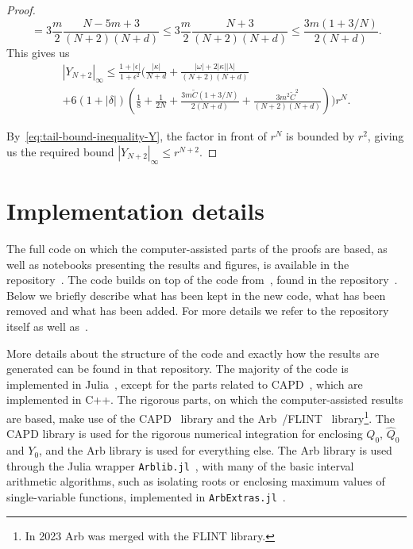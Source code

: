 \documentclass[11pt]{article}
\begin{document}
\begin{proof}
\begin{equation*}
    = 3\frac{m}{2}\frac{N - 5m + 3}{(N + 2)(N + d)}
    \leq 3\frac{m}{2}\frac{N + 3}{(N + 2)(N + d)}
    \leq \frac{3m(1 + 3/N)}{2(N + d)}.
  \end{equation*}
  This gives us
  \begin{multline*}
    |Y_{N + 2}|_{\infty} \leq
    \frac{1 + |\epsilon|}{1 + \epsilon^{2}}\Bigg(
    \frac{|\kappa|}{N + d}
    + \frac{|\omega| + 2|\kappa||\lambda|}{(N + 2)(N + d)}\\
    + 6(1 + |\delta|)\left(
        \frac{1}{8} + \frac{1}{2N}
        + \frac{3m\tilde{C}(1 + 3/N)}{2(N + d)}
        + \frac{3m^{2}\tilde{C}^{2}}{(N + 2)(N + d)}
      \right)
    \Bigg)r^{N}.
  \end{multline*}

  By~\eqref{eq:tail-bound-inequality-Y}, the factor in front of
  \(r^{N}\) is bounded by \(r^{2}\), giving us the required bound
  \(|Y_{N + 2}|_{\infty} \leq r^{N + 2}\).
\end{proof}

\section{Implementation details}
\label{sec:implementation-details}
The full code on which the computer-assisted parts of the proofs are
based, as well as notebooks presenting the results and figures, is
available in the repository~\cite{CGL2.jl}. The code builds on top of
the code from~\cite{Dahne2024}, found in the repository~\cite{CGL.jl}.
Below we briefly describe what has been kept in the new code, what has
been removed and what has been added. For more details we refer to the
repository itself as well as~\cite{Dahne2024}.

More details about the structure of the code and exactly how the
results are generated can be found in that repository. The majority of
the code is implemented in Julia~\cite{Julia-2017}, except for the
parts related to CAPD~\cite{Kapela2021}, which are implemented in C++.
The rigorous parts, on which the computer-assisted results are based,
make use of the CAPD~\cite{Kapela2021} library and the
Arb~\cite{Johansson2017arb}/FLINT~\cite{Flint} library\footnote{In
  2023 Arb was merged with the FLINT library.}. The CAPD library is
used for the rigorous numerical integration for enclosing \(Q_{0}\),
\(\hat{Q}_{0}\) and \(Y_{0}\), and the Arb library is used for
everything else. The Arb library is used through the Julia wrapper
\texttt{Arblib.jl}~\cite{Arblib.jl}, with many of the basic interval
arithmetic algorithms, such as isolating roots or enclosing maximum
values of single-variable functions, implemented in
\texttt{ArbExtras.jl}~\cite{ArbExtras.jl}.
\end{document}
